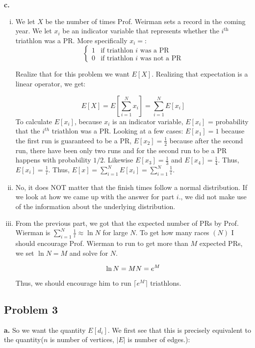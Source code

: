 \documentclass[12 pt]{article}
\begin{document}
	\noindent \textbf{c.}
	\begin{enumerate}[i.] 
		\item We let $X$ be the number of times Prof. Weirman sets a record in the coming year. We let $x_i$ be an indicator variable that represents whether the $i^{\text{th}}$ triathlon was a PR. More specifically $x_i = $:
		\[ \begin{cases} 
		1 & \text{if triathlon $i$ was a PR} \\
		0 & \text{if triathlon $i$ was not a PR}
		\end{cases}
		\]
		
		\noindent Realize that for this problem we want $E[X]$. Realizing that expectation is a linear operator, we get:
		
		\begin{equation}
		E[X] = E[\sum_{i=1}^N x_i] = \sum_{i=1}^N E[x_i]
		\end{equation}
		\noindent To calculate $E[x_i]$, because $x_i$ is an indicator variable, $E[x_i]$ = probability that the $i^{th}$ triathlon was a PR. Looking at a few cases: $E[x_1] = 1$ because the first run is guaranteed to be a PR, $E[x_2] = \frac{1}{2}$ because after the second run, there have been only two runs and for the second run to be a PR happens with probability $1/2$. Likewise $E[x_3] = \frac{1}{3}$ and $E[x_4] = \frac{1}{4}$. Thus, $E[x_i] = \frac{1}{i}$. Thus, $E[x] = \sum_{i=1}^N E[x_i] = \sum_{i=1}^N \frac{1}{i}$.
		\item No, it does NOT matter that the finish times follow a normal distribution. If we look at how we came up with the answer for part $i.$, we did not make use of the information about the underlying distribution.
		\item From the previous part, we got that the expected number of PRs by Prof. Wierman is $\sum_{i=1}^N \frac{1}{i} \approx \ln N$ for large $N$. To get how many races $(N)$ I should encourage Prof. Wierman to run to get more than $M$ expected PRs, we set $\ln N = M$ and solve for $N$. 
		
		\begin{equation}
		\ln N = M \\
		N = e^M
		\end{equation}
		
		\noindent Thus, we should encourage him to run $\lceil e^M \rceil$ triathlons. 
	\end{enumerate}

	\subsection*{Problem 3}
	\noindent \textbf{a.} So we want the quantity $E[d_i]$. We first see that this is precisely equivalent to the quantity($n$ is number of vertices, $|E|$ is number of edges.):
	
\end{document}
